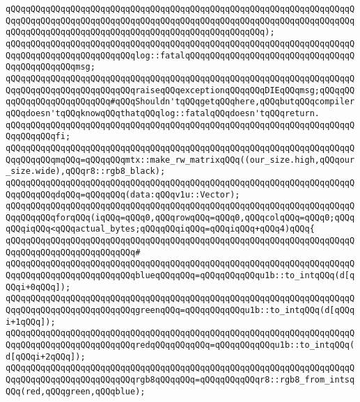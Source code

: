 \verb|qQQqqQQqqQQqqQQqqQQqqQQqqQQqqQQqqQQqqQQqqQQqqQQqqQQqqQQqqQQqqQQqqQQqqQQqqQQqqQQqqQQqqQQqqQQqqQQqqQQqqQQqqQQqqQQqqQQqqQQqqQQqqQQqqQQqqQQqqQQqqQQqqQQqqQQqqQQqqQQqqQQqqQQqqQQqqQQqqQQqqQQqqQQqqQQq);|\newline
\verb|qQQqqQQqqQQqqQQqqQQqqQQqqQQqqQQqqQQqqQQqqQQqqQQqqQQqqQQqqQQqqQQqqQQqqQQqqQQqqQQqqQQqqQQqqQQqqQQqlog::fatalqQQqqQQqqQQqqQQqqQQqqQQqqQQqqQQqqQQqqQQqqQQqqQQqmsg;|\newline
\verb|qQQqqQQqqQQqqQQqqQQqqQQqqQQqqQQqqQQqqQQqqQQqqQQqqQQqqQQqqQQqqQQqqQQqqQQqqQQqqQQqqQQqqQQqqQQqqQQqraiseqQQqexceptionqQQqqQQqDIEqQQqmsg;qQQqqQQqqQQqqQQqqQQqqQQqqQQq#qQQqShouldn'tqQQqgetqQQqhere,qQQqbutqQQqcompilerqQQqdoesn'tqQQqknowqQQqthatqQQqlog::fatalqQQqdoesn'tqQQqreturn.|\newline
\verb|qQQqqQQqqQQqqQQqqQQqqQQqqQQqqQQqqQQqqQQqqQQqqQQqqQQqqQQqqQQqqQQqqQQqqQQqqQQqqQQqfi;|\newline
\newline
\verb|qQQqqQQqqQQqqQQqqQQqqQQqqQQqqQQqqQQqqQQqqQQqqQQqqQQqqQQqqQQqqQQqqQQqqQQqqQQqqQQqmqQQq=qQQqqQQqmtx::make_rw_matrixqQQq((our_size.high,qQQqour_size.wide),qQQqr8::rgb8_black);|\newline
\newline
\verb|qQQqqQQqqQQqqQQqqQQqqQQqqQQqqQQqqQQqqQQqqQQqqQQqqQQqqQQqqQQqqQQqqQQqqQQqqQQqqQQqdqQQq=qQQqqQQq(data:qQQqv1u::Vector);|\newline
\newline
\verb|qQQqqQQqqQQqqQQqqQQqqQQqqQQqqQQqqQQqqQQqqQQqqQQqqQQqqQQqqQQqqQQqqQQqqQQqqQQqqQQqforqQQq(iqQQq=qQQq0,qQQqrowqQQq=qQQq0,qQQqcolqQQq=qQQq0;qQQqqQQqiqQQq<qQQqactual_bytes;qQQqqQQqiqQQq=qQQqiqQQq+qQQq4)qQQq{|\newline
\verb|qQQqqQQqqQQqqQQqqQQqqQQqqQQqqQQqqQQqqQQqqQQqqQQqqQQqqQQqqQQqqQQqqQQqqQQqqQQqqQQqqQQqqQQqqQQqqQQq#|\newline
\verb|qQQqqQQqqQQqqQQqqQQqqQQqqQQqqQQqqQQqqQQqqQQqqQQqqQQqqQQqqQQqqQQqqQQqqQQqqQQqqQQqqQQqqQQqqQQqqQQqblueqQQqqQQq=qQQqqQQqqQQqu1b::to_intqQQq(d[qQQqi+0qQQq]);|\newline
\verb|qQQqqQQqqQQqqQQqqQQqqQQqqQQqqQQqqQQqqQQqqQQqqQQqqQQqqQQqqQQqqQQqqQQqqQQqqQQqqQQqqQQqqQQqqQQqqQQqgreenqQQq=qQQqqQQqqQQqu1b::to_intqQQq(d[qQQqi+1qQQq]);|\newline
\verb|qQQqqQQqqQQqqQQqqQQqqQQqqQQqqQQqqQQqqQQqqQQqqQQqqQQqqQQqqQQqqQQqqQQqqQQqqQQqqQQqqQQqqQQqqQQqqQQqredqQQqqQQqqQQq=qQQqqQQqqQQqu1b::to_intqQQq(d[qQQqi+2qQQq]);|\newline
\newline
\verb|qQQqqQQqqQQqqQQqqQQqqQQqqQQqqQQqqQQqqQQqqQQqqQQqqQQqqQQqqQQqqQQqqQQqqQQqqQQqqQQqqQQqqQQqqQQqqQQqrgb8qQQqqQQq=qQQqqQQqqQQqr8::rgb8_from_intsqQQq(red,qQQqgreen,qQQqblue);|\newline
